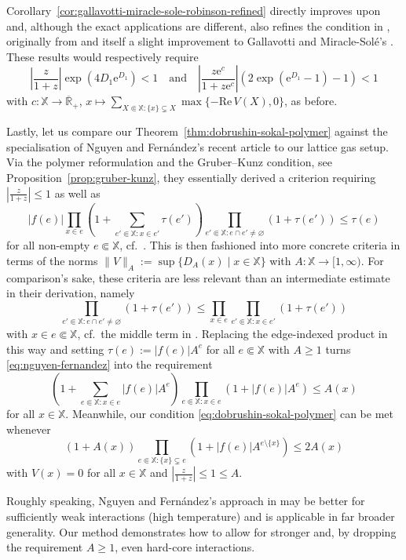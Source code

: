\documentclass[10pt,a4paper]{amsart}
\newcommand{\e}{\mathrm{e}}
\newcommand{\R}{\mathbb{R}}
\newcommand{\X}{\mathbb X}
\newcommand{\be}{\begin{equation}}
\newcommand{\ee}{\end{equation}}
\renewcommand{\Re}{\mathrm{Re}\,}
\begin{document}
Corollary~\ref{cor:gallavotti-miracle-sole-robinson-refined} directly improves upon \cite[Theorem~5]{ref:procacci-scoppola} and, although the exact applications are different, also refines the condition in \cite[Theorem~4.2.7]{ref:ruelle}, originally from \cite{ref:gallavotti-miracle-sole-robinson} and itself a slight improvement to Gallavotti and Miracle-Sol{\'e}'s \cite{ref:gallavotti-miracle-sole}. 
These results would respectively require
\[
	|{\textstyle \frac{z}{1+z}}| \exp(4 {D_1} \e^{D_1}) < 1 \quad \text{and} \quad |{\textstyle \frac{z \e^c}{1+z\e^c}}| (2 \exp(\e^{D_1} - 1) - 1) < 1
\]
with $c : \X \to \overline{\R}_+$, $x \mapsto \sum_{X \Subset \X : \{x\} \subsetneq X} \max\{-\Re V(X), 0\}$, as before.

Lastly, let us compare our Theorem~\ref{thm:dobrushin-sokal-polymer} against the specialisation of Nguyen and Fern{\'a}ndez's recent article \cite{ref:nguyen-fernandez} to our lattice gas setup. 
Via the polymer reformulation and the Gruber--Kunz condition, see Proposition~\ref{prop:gruber-kunz}, they essentially derived a criterion requiring $|\frac{z}{1+z}| \leq 1$ as well as
\be \label{eq:nguyen-fernandez}
	|f(e)| \prod_{x \in e} \left( 1 + \sum_{e' \Subset \X : x \in e'} \tau(e') \right) \prod_{e' \Subset \X : e \cap e' \neq \varnothing} (1 + \tau(e')) \leq \tau(e)
\ee
for all non-empty $e \Subset \X$, cf.\ \cite[(107)]{ref:nguyen-fernandez}. 
This is then fashioned into more concrete criteria in terms of the norms $\|V\|_A := \sup \{D_A(x) \mid x\in\X\}$ with $A : \X \to [1,\infty)$. 
For comparison's sake, these criteria are less relevant than an intermediate estimate in their derivation, namely
\[
	\prod_{e' \Subset \X : e \cap e' \neq \varnothing} (1 + \tau(e')) \leq \prod_{x \in e} \prod_{e' \Subset \X : x \in e'} (1 + \tau(e'))
\]
with $x \in e \Subset \X$, cf.\ the middle term in \cite[(109)]{ref:nguyen-fernandez}. 
Replacing the edge-indexed product in this way and setting $\tau(e) := |f(e)| A^e$ for all $e \Subset \X$ with $A \geq 1$ turns \eqref{eq:nguyen-fernandez} into the requirement
\[
	\left( 1 + \sum_{e \Subset \X : x \in e} |f(e)| A^e \right) \prod_{e \Subset \X : x \in e} (1 + |f(e)| A^e) \leq A(x)
\]
for all $x \in \X$. 
Meanwhile, our condition \eqref{eq:dobrushin-sokal-polymer} can be met whenever
\[
	(1 + A(x)) \prod_{e \Subset \X : \{x\} \subsetneq e} (1 + |f(e)| A^{e \setminus \{x\}}) \leq 2 A(x)
\]
with $V(x) = 0$ for all $x \in \X$ and $|\frac{z}{1+z}| \leq 1 \leq A$. 

Roughly speaking, Nguyen and Fern{\'a}ndez's approach in \cite{ref:nguyen-fernandez} may be better for sufficiently weak interactions (high temperature) and is applicable in far broader generality. 
Our method demonstrates how to allow for stronger and, by dropping the requirement $A\geq 1$, even hard-core interactions.
\end{document}
